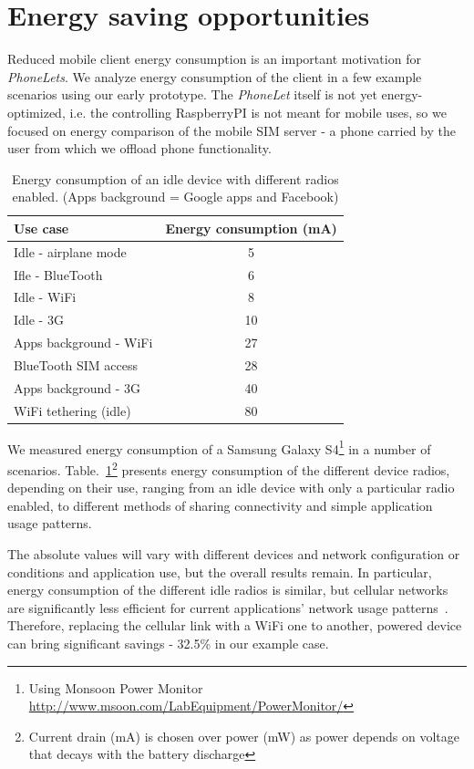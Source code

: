 \documentclass{sig-alternate-2013}
\begin{document}
\section{Energy saving opportunities}
\label{sec:energy}

Reduced mobile client energy consumption is an important motivation for \emph{PhoneLets}. We analyze energy consumption of the client in a few example scenarios using our early prototype. The \emph{PhoneLet} itself is not yet energy-optimized, i.e. the controlling RaspberryPI is not meant for mobile uses, so we focused on energy comparison of the mobile SIM server - a phone carried by the user from which we offload phone functionality.

\begin{table}[t]
{
\small
\begin{tabular}{| l | c |}
\hline
  \textbf{Use case}         & \textbf{Energy consumption (mA)}  \\ \hline
  Idle - airplane mode      & 5     \\ \hline
  Ifle - BlueTooth          & 6     \\ \hline
  Idle - WiFi               & 8     \\ \hline
  Idle - 3G                 & 10    \\ \hline
  Apps background - WiFi    & 27    \\ \hline
  BlueTooth SIM access      & 28    \\ \hline
  Apps background - 3G      & 40    \\ \hline
  WiFi tethering (idle)     & 80    \\ \hline
\end{tabular}
}
\caption{Energy consumption of an idle device with different radios enabled. (Apps background = Google apps and Facebook)}
\label{tab:energy}
\end{table}

We measured energy consumption of a Samsung Galaxy S4\footnote{Using Monsoon Power Monitor \url{http://www.msoon.com/LabEquipment/PowerMonitor/}} in a number of scenarios. Table.~\ref{tab:energy}\footnote{Current drain (mA) is chosen over power (mW) as power depends on voltage that decays with the battery discharge} presents energy consumption of the different device radios, depending on their use, ranging from an idle device with only a particular radio enabled, to different methods of sharing connectivity and simple application usage patterns.

The absolute values will vary with different devices and network configuration or conditions and application use, but the overall results remain. In particular, energy consumption of the different idle radios is similar, but cellular networks are significantly less efficient for current applications' network usage patterns~\cite{Aucinas:2013uk}. Therefore, replacing the cellular link with a WiFi one to another, powered device can bring significant savings - 32.5\% in our example case.
\end{document}
